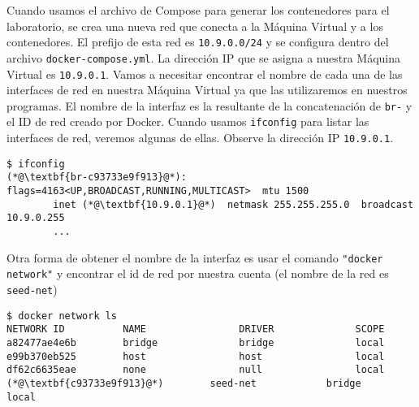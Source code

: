 Cuando usamos el archivo de Compose para generar los contenedores para el laboratorio, se crea una nueva red que conecta a la Máquina Virtual y a los contenedores. El prefijo de esta red es \texttt{10.9.0.0/24} y se configura dentro del archivo \texttt{docker-compose.yml}. La dirección IP que se asigna a nuestra Máquina Virtual es \texttt{10.9.0.1}. Vamos a necesitar encontrar el nombre de cada una de las interfaces de red en nuestra Máquina Virtual ya que las utilizaremos en nuestros programas. El nombre de la interfaz es la resultante de la concatenación de \texttt{br-} y el ID de red creado por Docker.
Cuando usamos \texttt{ifconfig} para listar las interfaces de red, veremos algunas de ellas. Observe la dirección IP \texttt{10.9.0.1}.


\begin{lstlisting}
$ ifconfig
(*@\textbf{br-c93733e9f913}@*): flags=4163<UP,BROADCAST,RUNNING,MULTICAST>  mtu 1500
        inet (*@\textbf{10.9.0.1}@*)  netmask 255.255.255.0  broadcast 10.9.0.255
        ...
\end{lstlisting}

Otra forma de obtener el nombre de la interfaz es usar el comando \texttt{"docker network"} y encontrar el id de red por nuestra cuenta (el nombre de la red es \texttt{seed-net})

\begin{lstlisting}
$ docker network ls
NETWORK ID          NAME                DRIVER              SCOPE
a82477ae4e6b        bridge              bridge              local
e99b370eb525        host                host                local
df62c6635eae        none                null                local
(*@\textbf{c93733e9f913}@*)        seed-net            bridge              local
\end{lstlisting}



